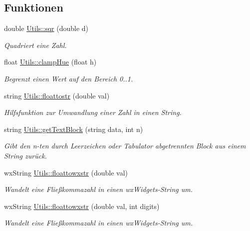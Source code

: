 \subsection*{Funktionen}
\begin{DoxyCompactItemize}
\item 
double \hyperlink{namespaceUtils_afac34330dde6235ee7395a4fd412ae0d}{Utils\-::sqr} (double d)
\begin{DoxyCompactList}\small\item\em Quadriert eine Zahl. \end{DoxyCompactList}\item 
float \hyperlink{namespaceUtils_abb647325616858e0fad55290c36ea03b}{Utils\-::clamp\-Hue} (float h)
\begin{DoxyCompactList}\small\item\em Begrenzt einen Wert auf den Bereich 0..1. \end{DoxyCompactList}\item 
string \hyperlink{namespaceUtils_a76b506eef525971ab3ccb328f4ca879d}{Utils\-::floattostr} (double val)
\begin{DoxyCompactList}\small\item\em Hilfsfunktion zur Umwandlung einer Zahl in einen String. \end{DoxyCompactList}\item 
string \hyperlink{namespaceUtils_ab5711927eff2cdd7123d98d343f0dfad}{Utils\-::get\-Text\-Block} (string data, int n)
\begin{DoxyCompactList}\small\item\em Gibt den n-\/ten durch Leerzeichen oder Tabulator abgetrennten Block aus einem String zurück. \end{DoxyCompactList}\item 
wx\-String \hyperlink{namespaceUtils_a233ff9a0b34b10195a434f1ff66323b8}{Utils\-::floattowxstr} (double val)
\begin{DoxyCompactList}\small\item\em Wandelt eine Fließkommazahl in einen wx\-Widgets-\/\-String um. \end{DoxyCompactList}\item 
wx\-String \hyperlink{namespaceUtils_ac47160b3665d77f9e1a49a4045053add}{Utils\-::floattowxstr} (double val, int digits)
\begin{DoxyCompactList}\small\item\em Wandelt eine Fließkommazahl in einen wx\-Widgets-\/\-String um. \end{DoxyCompactList}\item 

\end{DoxyCompactItemize}
